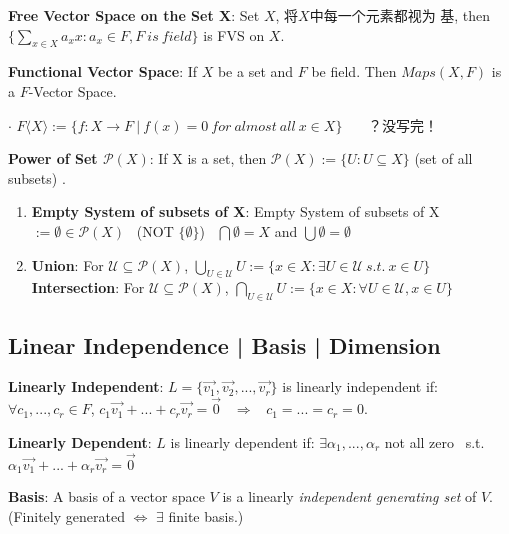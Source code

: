 \documentclass[9pt]{article}
\begin{document}
\textbf{Free Vector Space on the Set X}: Set $X$, 将$X$中每一个元素都视为 基, then $\{\sum_{x\in X}a_xx:a_x\in F,F \ is \ field\}$ is FVS on $X$.

\textbf{Functional Vector Space}: If $X$ be a set and $F$ be field. Then $Maps(X,F)$ is a $F$-Vector Space. \quad {}

$\cdot$ $F\langle X\rangle:=\{f:X\to F \ | \ f(x)=0 \ for \ almost \ all \ x\in X\}$ \quad \quad {} \ \ \ ？没写完！

\textbf{Power of Set $\mathcal{P}(X)$}: If X is a set, then $\mathcal{P}(X):=\{U:U\subseteq X\}$ {\scriptsize (set of all subsets)} \quad {}.

\begin{enumerate}[itemsep=-2pt, topsep=-2pt]
    \item \textbf{Empty System of subsets of X}: Empty System of subsets of X $:=\emptyset\in\mathcal{P}(X)$ \ {\scriptsize (NOT $\{\emptyset\}$)} \quad \quad \quad \star \ $\bigcap\emptyset=X$ \quad and \quad $\bigcup\emptyset=\emptyset$ \ \star
    \item \textbf{Union}: {\small For $\mathcal{U}\subseteq\mathcal{P}(X)$, $\bigcup_{U\in\mathcal{U}}U:=\{x\in X:\exists U\in\mathcal{U} \ s.t. \ x\in U\}$} \quad \textbf{Intersection}: {\small For $\mathcal{U}\subseteq\mathcal{P}(X)$, $\bigcap_{U\in\mathcal{U}}U:=\{x\in X:\forall U\in\mathcal{U},x\in U\}$}
\end{enumerate}


\subsection{Linear Independence | Basis | Dimension}

\textbf{Linearly Independent}: $L=\{\vec{v_1},\vec{v_2},...,\vec{v_r}\}$ is linearly independent if: \ $\forall c_1,...,c_r\in F$, $c_1\vec{v_1}+...+c_r\vec{v_r}=\vec{0}$ \ $\Rightarrow$ \ $c_1=...=c_r=0$.

\textbf{Linearly Dependent}: $L$ is linearly dependent if: $\exists \alpha_1,...,\alpha_r$ not all zero \ s.t. \ $\alpha_1\vec{v_1}+...+\alpha_r\vec{v_r}=\vec{0}$

\textbf{Basis}: A basis of a vector space $V$ is a linearly \textit{independent} \textit{generating set} of $V$. \quad \quad (Finitely generated $\Leftrightarrow$ $\exists$ finite basis.)
\end{document}
